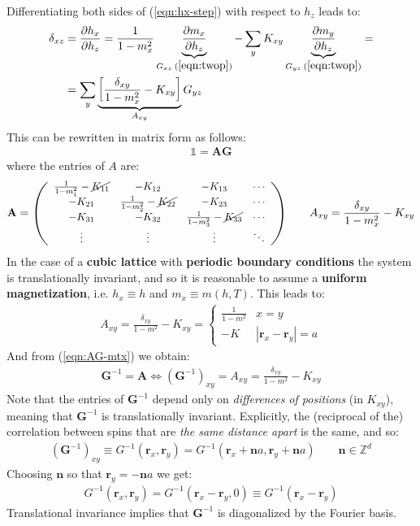 \documentclass[../../main.tex]{subfiles}
\begin{document}
Differentiating both sides of (\ref{eqn:hx-step}) with respect to $h_z$ leads to:
\begin{align*}
\delta_{xz} &= \pdv{h_x}{h_z} = \frac{1}{1-m_x^2} \underbrace{\pdv{m_x}{h_z}}_{G_{xz} \> (\ref{eqn:twop})} - \sum_y K_{xy} \underbrace{\pdv{m_y}{h_z}}_{G_{yz}\>(\ref{eqn:twop})} =\\
&= \sum_y \underbrace{\left[\frac{\delta_{xy}}{1-m_x^2} - K_{xy} \right]}_{A_{xy}} G_{yz}
\end{align*}
This can be rewritten in matrix form as follows:
\begin{align}\label{eqn:AG-mtx}
    \mathbb{1} = \textbf{A} \textbf{G}
\end{align}
where the entries of $A$ are:
\begin{align*}
    \textbf{A}  = \resizebox{8cm}{!}{$\left(\begin{array}{cccc}
        \frac{1}{1-m_1^2}  - \cancel{K_{11}} & -K_{12} & -K_{13} & \cdots \\ 
        -K_{21} & \frac{1}{1-m_2^2}  - \cancel{K_{22}} & -K_{23} & \cdots \\ 
        -K_{31} & -K_{32} & \frac{1}{1-m_3^2}  - \cancel{K_{33}} & \cdots \\ 
        \vdots & \vdots & \vdots & \ddots
        \end{array}\right)$} \qquad A_{xy} = \frac{\delta_{xy}}{1-m_x^2} - K_{xy} 
\end{align*}
In the case of a \textbf{cubic lattice} with \textbf{periodic boundary conditions} the system is translationally invariant, and so it is reasonable to assume a \textbf{uniform magnetization}, i.e. $h_x \equiv h$ and $m_x \equiv m(h,T)$. This leads to:
\begin{align*}
    A_{xy} = \frac{\delta_{xy}}{1-m^2} - K_{xy} = \begin{cases}
        \frac{1}{1-m^2} & x=y\\
        -K & |\bm{r}_x-\bm{r}_y| = a 
    \end{cases} 
\end{align*}
And from (\ref{eqn:AG-mtx}) we obtain:
\begin{align}\label{eqn:G-mtx}
    \textbf{G}^{-1} = \textbf{A}  \Leftrightarrow (\textbf{G}^{-1})_{xy} = A_{xy} = \frac{\delta_{xy}}{1-m^2} - K_{xy} 
\end{align}
Note that the entries of $\textbf{G}^{-1}$ depend only on \textit{differences of positions} (in $K_{xy}$), meaning that $\textbf{G}^{-1}$ is translationally invariant. Explicitly, the (reciprocal of the) correlation between spins that are \textit{the same distance apart} is the same, and so:
\begin{align*}
    (\textbf{G}^{-1})_{xy} \equiv G^{-1}(\bm{r}_x, \bm{r}_y) = G^{-1}(\bm{r}_x + \bm{n}a, \bm{r}_y + \bm{n}a) \qquad \bm{n} \in \mathbb{Z}^d
\end{align*}  
Choosing $\bm{n}$ so that $\bm{r}_y = -\bm{n}a$ we get:
\begin{align}\label{eqn:corr_translational_invariance}
    G^{-1}(\bm{r}_x, \bm{r}_y) = G^{-1}(\bm{r}_x-\bm{r}_y,0) \equiv G^{-1}(\bm{r}_x - \bm{r}_y)
\end{align}
Translational invariance implies that $\textbf{G}^{-1}$ is diagonalized by the Fourier basis. 
\end{document}
